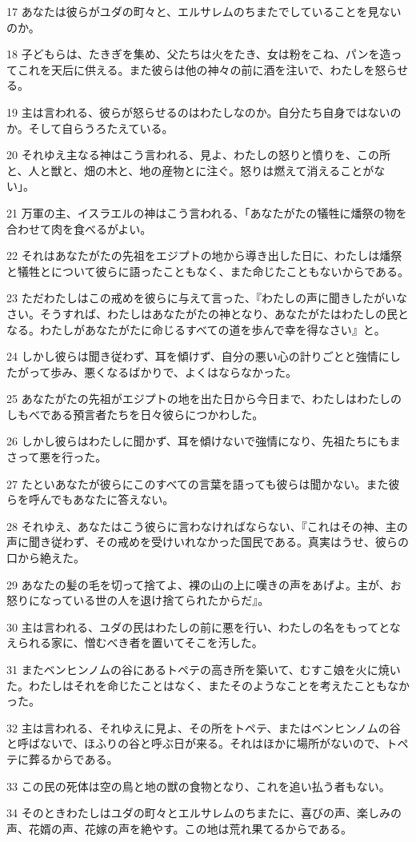 \par 17 あなたは彼らがユダの町々と、エルサレムのちまたでしていることを見ないのか。
\par 18 子どもらは、たきぎを集め、父たちは火をたき、女は粉をこね、パンを造ってこれを天后に供える。また彼らは他の神々の前に酒を注いで、わたしを怒らせる。
\par 19 主は言われる、彼らが怒らせるのはわたしなのか。自分たち自身ではないのか。そして自らうろたえている。
\par 20 それゆえ主なる神はこう言われる、見よ、わたしの怒りと憤りを、この所と、人と獣と、畑の木と、地の産物とに注ぐ。怒りは燃えて消えることがない」。
\par 21 万軍の主、イスラエルの神はこう言われる、「あなたがたの犠牲に燔祭の物を合わせて肉を食べるがよい。
\par 22 それはあなたがたの先祖をエジプトの地から導き出した日に、わたしは燔祭と犠牲とについて彼らに語ったこともなく、また命じたこともないからである。
\par 23 ただわたしはこの戒めを彼らに与えて言った、『わたしの声に聞きしたがいなさい。そうすれば、わたしはあなたがたの神となり、あなたがたはわたしの民となる。わたしがあなたがたに命じるすべての道を歩んで幸を得なさい』と。
\par 24 しかし彼らは聞き従わず、耳を傾けず、自分の悪い心の計りごとと強情にしたがって歩み、悪くなるばかりで、よくはならなかった。
\par 25 あなたがたの先祖がエジプトの地を出た日から今日まで、わたしはわたしのしもべである預言者たちを日々彼らにつかわした。
\par 26 しかし彼らはわたしに聞かず、耳を傾けないで強情になり、先祖たちにもまさって悪を行った。
\par 27 たといあなたが彼らにこのすべての言葉を語っても彼らは聞かない。また彼らを呼んでもあなたに答えない。
\par 28 それゆえ、あなたはこう彼らに言わなければならない、『これはその神、主の声に聞き従わず、その戒めを受けいれなかった国民である。真実はうせ、彼らの口から絶えた。
\par 29 あなたの髪の毛を切って捨てよ、裸の山の上に嘆きの声をあげよ。主が、お怒りになっている世の人を退け捨てられたからだ』。
\par 30 主は言われる、ユダの民はわたしの前に悪を行い、わたしの名をもってとなえられる家に、憎むべき者を置いてそこを汚した。
\par 31 またベンヒンノムの谷にあるトペテの高き所を築いて、むすこ娘を火に焼いた。わたしはそれを命じたことはなく、またそのようなことを考えたこともなかった。
\par 32 主は言われる、それゆえに見よ、その所をトペテ、またはベンヒンノムの谷と呼ばないで、ほふりの谷と呼ぶ日が来る。それはほかに場所がないので、トペテに葬るからである。
\par 33 この民の死体は空の鳥と地の獣の食物となり、これを追い払う者もない。
\par 34 そのときわたしはユダの町々とエルサレムのちまたに、喜びの声、楽しみの声、花婿の声、花嫁の声を絶やす。この地は荒れ果てるからである。

